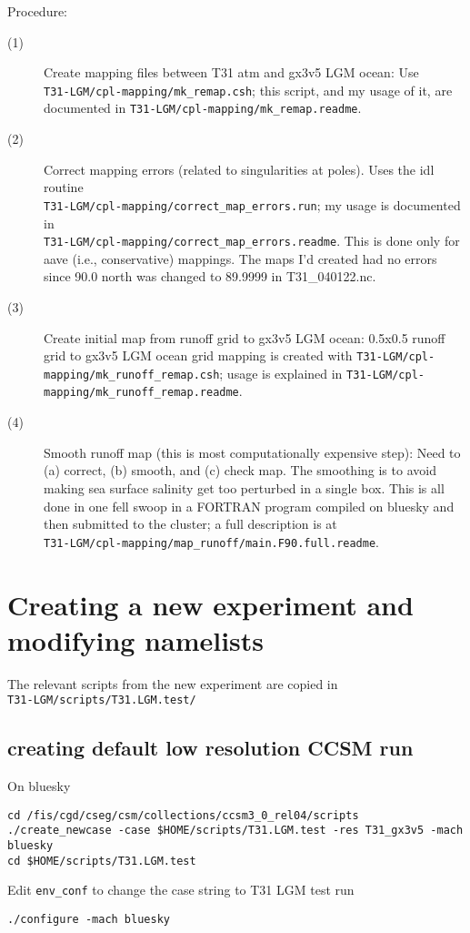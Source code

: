 \documentclass[authoryear,round,12pt]{article}
\begin{document}
Procedure:
\begin{description}
 
\item[(1)] Create mapping files between T31 atm and gx3v5 LGM
  ocean: Use\\
  \verb+T31-LGM/cpl-mapping/mk_remap.csh+; this script, and my usage
  of it, are documented in \verb+T31-LGM/cpl-mapping/mk_remap.readme+.

\item[(2)] Correct mapping errors (related to singularities at poles).
  Uses the idl routine\\
  \verb+T31-LGM/cpl-mapping/correct_map_errors.run+; my usage is
  documented in\\
  \verb+T31-LGM/cpl-mapping/correct_map_errors.readme+. This is done
  only for aave (i.e., conservative) mappings. The maps I'd created
  had no errors since 90.0 north was changed to 89.9999 in
  T31\_040122.nc.

\item[(3)] Create initial map from runoff grid to gx3v5 LGM ocean:
  0.5x0.5 runoff grid to gx3v5 LGM ocean grid mapping is created with
  \verb+T31-LGM/cpl-mapping/mk_runoff_remap.csh+; usage is explained
  in \verb+T31-LGM/cpl-mapping/mk_runoff_remap.readme+.

\item[(4)] Smooth runoff map (this is most computationally expensive
  step): Need to (a) correct, (b) smooth, and (c) check map. The
  smoothing is to avoid making sea surface salinity get too perturbed
  in a single box. This is all done in one fell swoop in a FORTRAN
  program compiled on bluesky and then submitted to the cluster; a
  full
  description is at\\
  \verb+T31-LGM/cpl-mapping/map_runoff/main.F90.full.readme+.

\end{description}

\section{Creating a new experiment and modifying namelists}
\label{sec:namelists}

The relevant scripts from the new experiment are copied in\\
\verb+T31-LGM/scripts/T31.LGM.test/+

\subsection{creating default low resolution CCSM run}
On bluesky
\begin{verbatim}
cd /fis/cgd/cseg/csm/collections/ccsm3_0_rel04/scripts
./create_newcase -case $HOME/scripts/T31.LGM.test -res T31_gx3v5 -mach bluesky
cd $HOME/scripts/T31.LGM.test
\end{verbatim}
Edit \verb+env_conf+ to change the case string to T31 LGM test run
\begin{verbatim}
./configure -mach bluesky
\end{verbatim}
\end{document}
